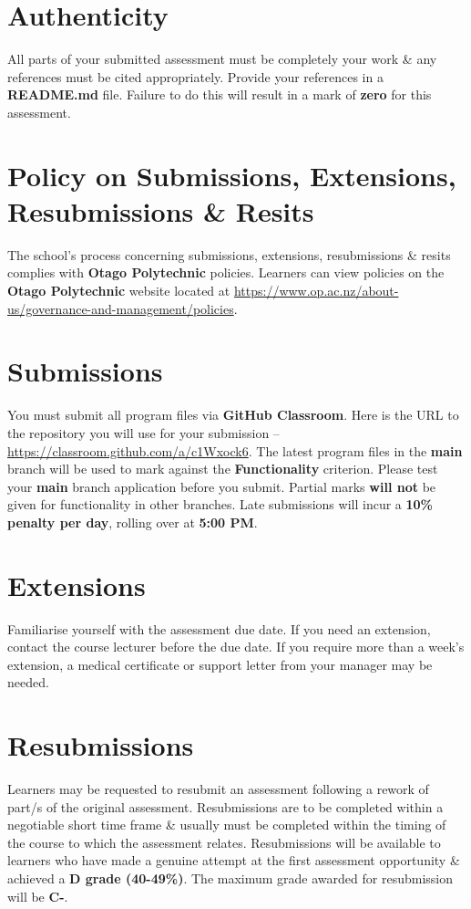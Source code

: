 \documentclass{article}
\begin{document}
\section*{Authenticity}
All parts of your submitted assessment must be completely your work \& any references must be cited appropriately. Provide your references in a \textbf{README.md} file. Failure to do this will result in a mark of \textbf{zero} for this assessment.

\section*{Policy on Submissions, Extensions, Resubmissions \& Resits}
The school's process concerning submissions, extensions, resubmissions \& resits complies with \textbf{Otago Polytechnic} policies. Learners can view policies on the \textbf{Otago Polytechnic} website located at \href{https://www.op.ac.nz/about-us/governance-and-management/policies}{https://www.op.ac.nz/about-us/governance-and-management/policies}.

\section*{Submissions}
You must submit all program files via \textbf{GitHub Classroom}. Here is the URL to the repository you will use for your submission – \href{https://classroom.github.com/a/c1Wxock6}{https://classroom.github.com/a/c1Wxock6}. The latest program files in the \textbf{main} branch will be used to mark against the \textbf{Functionality} criterion. Please test your \textbf{main} branch application before you submit. Partial marks \textbf{will not} be given for functionality in other branches. Late submissions will incur a \textbf{10\% penalty per day}, rolling over at \textbf{5:00 PM}.

\section*{Extensions}
Familiarise yourself with the assessment due date. If you need an extension, contact the course lecturer before the due date. If you require more than a week's extension, a medical certificate or support letter from your manager may be needed.

\section*{Resubmissions}
Learners may be requested to resubmit an assessment following a rework of part/s of the original assessment. Resubmissions are to be completed within a negotiable short time frame \& usually must be completed within the timing of the course to which the assessment relates. Resubmissions will be available to learners who have made a genuine attempt at the first assessment opportunity \& achieved a \textbf{D grade (40-49\%)}. The maximum grade awarded for resubmission will be \textbf{C-}.
\end{document}

